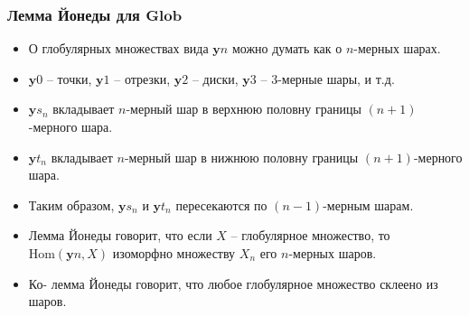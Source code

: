 \documentclass{beamer}
\theoremstyle{definition}
\newcommand{\cat}[1]{\mathbf{#1}}
\newcommand{\y}{\cat{y}}
\newcommand{\Hom}{\mathrm{Hom}}
\begin{document}
\begin{frame}
\frametitle{Лемма Йонеды для $\cat{Glob}$}
\begin{itemize}
\item О глобулярных множествах вида $\y n$ можно думать как о $n$-мерных шарах.
\item $\y 0$ -- точки, $\y 1$ -- отрезки, $\y 2$ -- диски, $\y 3$ -- 3-мерные шары, и т.д.
\item $\y s_n$ вкладывает $n$-мерный шар в верхнюю половну границы $(n+1)$-мерного шара.
\item $\y t_n$ вкладывает $n$-мерный шар в нижнюю половну границы $(n+1)$-мерного шара.
\item Таким образом, $\y s_n$ и $\y t_n$ пересекаются по $(n-1)$-мерным шарам.
\item Лемма Йонеды говорит, что если $X$ -- глобулярное множество, то $\Hom(\y n, X)$ изоморфно множеству $X_n$ его $n$-мерных шаров.
\item Ко- лемма Йонеды говорит, что любое глобулярное множество склеено из шаров.
\end{itemize}
\end{frame}
\end{document}
